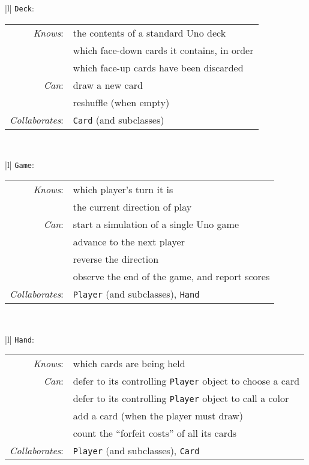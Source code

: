 \begin{center}
\begin{tabular}{|l|}
\hline
\texttt{Deck}:\\
\hline
\begin{tabular}{rl}
\textit{Knows}: & the contents of a standard Uno deck \\
& which face-down cards it contains, in order \\
& which face-up cards have been discarded \\
\textit{Can}: & draw a new card \\
& reshuffle (when empty) \\
\hline
\textit{Collaborates}: & \texttt{Card} (and subclasses)\\
\end{tabular}\\
\hline
\end{tabular}
\end{center}

\begin{center}
\begin{tabular}{|l|}
\hline
\texttt{Game}:\\
\hline
\begin{tabular}{rl}
\textit{Knows}: & which player's turn it is \\
& the current direction of play \\
\textit{Can}: & start a simulation of a single Uno game \\
& advance to the next player \\
& reverse the direction \\
& observe the end of the game, and report scores \\
\hline
\textit{Collaborates}: & \texttt{Player} (and subclasses), \texttt{Hand} \\
\end{tabular}\\
\hline
\end{tabular}
\end{center}

\begin{center}
\begin{tabular}{|l|}
\hline
\texttt{Hand}:\\
\hline
\begin{tabular}{rl}
\textit{Knows}: & which cards are being held \\
\textit{Can}: & defer to its controlling \texttt{Player} object to choose a card \\
& defer to its controlling \texttt{Player} object to call a color \\
& add a card (when the player must draw) \\
& count the ``forfeit costs'' of all its cards \\
\hline
\textit{Collaborates}: & \texttt{Player} (and subclasses), \texttt{Card}\\
\end{tabular}\\
\hline
\end{tabular}
\end{center}

